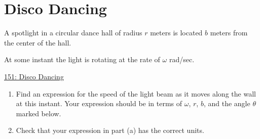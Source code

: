 \documentclass{ximera}
\begin{document}
\section{Disco Dancing}
\begin{question}  \label{QLKDKGDCCCC}
A spotlight in a circular dance hall of radius $r$ meters is located $b$ meters from the center of the hall. 

At some instant the light is rotating at the rate of $\omega$ rad/sec. 

\begin{onlineOnly}
   \begin{center}
\end{center}
\end{onlineOnly}

\href{https://www.desmos.com/calculator/m2o267u9ur}{151: Disco Dancing}


\begin{enumerate}
\item Find an expression for the speed of the light beam as it moves along the wall at this instant. Your expression should be in terms of $\omega$, $r$, $b$, and the angle $\theta$ marked below.

\item Check that your expression in  part (a) has the correct units.

\end{enumerate}

\end{question}
\end{document}

